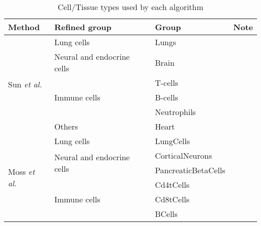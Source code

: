 \documentclass[12pt,letterpaper]{article}
\begin{document}
\begin{table}[H]
    \begin{center}
        \caption{Cell/Tissue types used by each algorithm }
        \begin{tabular}{|l|l|l|l|}
            \hline
            \textbf{Method}                         & \textbf{Refined group}                      & \textbf{Group}           & \textbf{Note} \\
            \hline
            \multirow{6}{*}{Sun \textit{et al.}}    & Lung cells                                  & Lungs                    &               \\
            \cline{2-4}                             & Neural and endocrine cells                  & Brain                    &               \\
            \cline{2-4}                             & \multirow{3}{*}{Immune cells}               & T-cells                  &               \\
            \cline{3-4}                             &                                             & B-cells                  &               \\
            \cline{3-4}                             &                                             & Neutrophils              &               \\
            \cline{2-4}                             & Others                                      & Heart                    &               \\
            \hline
            \multirow{6}{*}{Moss \textit{et al.}}   & Lung cells                                  & LungCells                &               \\
            \cline{2-4}                             & \multirow{2}{*}{Neural and endocrine cells} & CorticalNeurons          &               \\
            \cline{3-4}                             &                                             & PancreaticBetaCells      &               \\
            \cline{2-4}                             & \multirow{6}{*}{Immune cells}               & Cd4tCells                &               \\
            \cline{3-4}                             &                                             & Cd8tCells                &               \\
            \cline{3-4}                             &                                             & BCells                   &               \\

\end{tabular}
\end{center}
\end{table}
\end{document}
